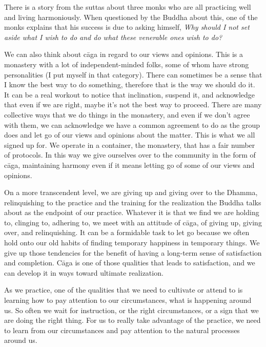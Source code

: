 There is a story from the suttas about three monks who are all 
practicing well and living harmoniously. When questioned by the Buddha 
about this, one of the monks explains that his success is due to asking 
himself, \emph{Why should I not set aside what I wish to do and do what 
these venerable ones wish to do?}

We can also think about cāga in regard to our views and opinions. This 
is a monastery with a lot of independent-minded folks, some of whom 
have strong personalities (I put myself in that category). There can 
sometimes be a sense that I know the best way to do something, 
therefore that is the way we should do it. It can be a real workout to 
notice that inclination, suspend it, and acknowledge that even if we 
are right, maybe it's not the best way to proceed. There are many 
collective ways that we do things in the monastery, and even if we 
don't agree with them, we can acknowledge we have a common agreement to 
do as the group does and let go of our views and opinions about the 
matter. This is what we all signed up for. We operate in a container, 
the monastery, that has a fair number of protocols. In this way we give 
ourselves over to the community in the form of cāga, maintaining 
harmony even if it means letting go of some of our views and opinions.

On a more transcendent level, we are giving up and giving over to the 
Dhamma, relinquishing to the practice and the training for the 
realization the Buddha talks about as the endpoint of our practice. 
Whatever it is that we find we are holding to, clinging to, adhering 
to, we meet with an attitude of cāga, of giving up, giving over, and 
relinquishing. It can be a formidable task to let go because we often 
hold onto our old habits of finding temporary happiness in temporary 
things. We give up those tendencies for the benefit of having a 
long-term sense of satisfaction and completion. Cāga is one of those 
qualities that leads to satisfaction, and we can develop it in ways 
toward ultimate realization.


As we practice, one of the qualities that we need to cultivate or 
attend to is learning how to pay attention to our circumstances, what 
is happening around us. So often we wait for instruction, or the right 
circumstances, or a sign that we are doing the right thing. For us to 
really take advantage of the practice, we need to learn from our 
circumstances and pay attention to the natural processes around us.

